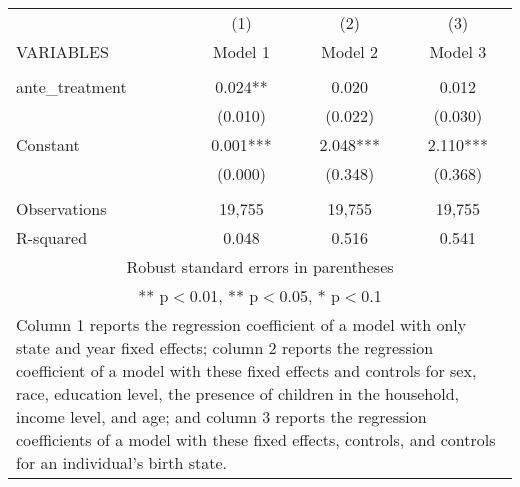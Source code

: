 \begin{tabular}{lccc}
\hline
 & (1) & (2) & (3) \\
VARIABLES & Model 1 & Model 2 & Model 3 \\ \hline
 &  &  &  \\
ante\_treatment & 0.024** & 0.020 & 0.012 \\
 & (0.010) & (0.022) & (0.030) \\
Constant & 0.001*** & 2.048*** & 2.110*** \\
 & (0.000) & (0.348) & (0.368) \\
 &  &  &  \\
Observations & 19,755 & 19,755 & 19,755 \\
 R-squared & 0.048 & 0.516 & 0.541 \\ \hline
\multicolumn{4}{c}{\small Robust standard errors in parentheses} \\
\multicolumn{4}{c}{\small *** p$<$0.01, ** p$<$0.05, * p$<$0.1} \\
\multicolumn{4}{p{0.8\linewidth}}{\small Column 1 reports the
regression coefficient of a model with only state and year fixed effects; column 2 reports the
regression coefficient of a model with these fixed effects and controls for sex, race, education
level, the presence of children in the household, income level, and age; and column 3 reports
the regression coefficients of a model with these fixed effects, controls, and controls for an
individual’s birth state.} \\
\end{tabular}
